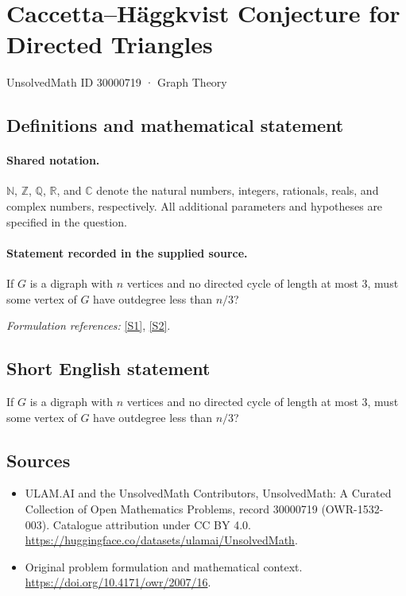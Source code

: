 \documentclass[11pt]{article}
\newcommand{\sref}[2]{\hyperlink{source:#1:#2}{[S#2]}}
\begin{document}
\setcounter{section}{30000718}
\section{Caccetta–Häggkvist Conjecture for Directed Triangles}\label{30000719}
{\small UnsolvedMath ID 30000719 · Graph Theory}
\subsection{Definitions and mathematical statement}

\paragraph{Shared notation.}$\mathbb N$, $\mathbb Z$, $\mathbb Q$, $\mathbb R$, and $\mathbb C$ denote the natural numbers, integers, rationals, reals, and complex numbers, respectively. All additional parameters and hypotheses are specified in the question.


\paragraph{Statement recorded in the supplied source.}
If $G$ is a digraph with $n$ vertices and no directed cycle of length at most $3$, must some vertex of $G$ have outdegree less than $n/3$?
\par\smallskip\textit{Formulation references:} \sref{30000719}{1}, \sref{30000719}{2}.
\subsection{Short English statement}
If $G$ is a digraph with $n$ vertices and no directed cycle of length at most $3$, must some vertex of $G$ have outdegree less than $n/3$?
\subsection{Sources}
\begin{itemize}
\item[\hypertarget{source:30000719:1}{S1}] ULAM.AI and the UnsolvedMath Contributors, UnsolvedMath: A Curated Collection of Open Mathematics Problems, record 30000719 (OWR-1532-003). Catalogue attribution under CC BY 4.0.
\url{https://huggingface.co/datasets/ulamai/UnsolvedMath}.
\item[\hypertarget{source:30000719:2}{S2}] Original problem formulation and mathematical context.
\url{https://doi.org/10.4171/owr/2007/16}.
\end{itemize}
\label{end:30000719}
\end{document}
